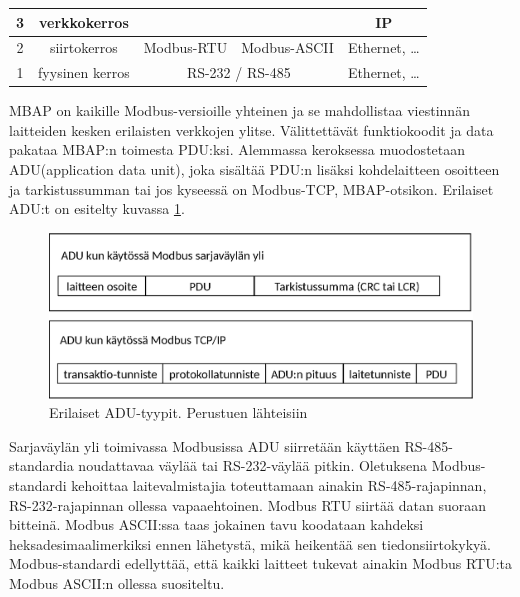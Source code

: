 \begin{table}
\begin{tabular}{|c|c|ccc}
        3                                         & verkkokerros                     &                                                         & \multicolumn{1}{c|}{}                                     & \multicolumn{1}{c|}{IP}                                                  \\ \hline
        2                                         & siirtokerros                     & \multicolumn{1}{c|}{\cellcolor{blue}Modbus-RTU}         & \multicolumn{1}{c|}{\cellcolor{blue}Modbus-ASCII}         & \multicolumn{1}{c|}{Ethernet, \dots}                                     \\ \hline
        1                                         & fyysinen kerros                  & \multicolumn{2}{c|}{RS-232 / RS-485}                                                                                & \multicolumn{1}{c|}{Ethernet, \dots}                                     \\ \hline
      \end{tabular}
      \label{rakenne}
    \end{table}

    \gls{MBAP} on kaikille Modbus-versioille yhteinen ja se mahdollistaa viestinnän laitteiden kesken erilaisten verkkojen ylitse. Välittettävät funktiokoodit ja data pakataa \gls{MBAP}:n toimesta PDU:ksi. Alemmassa keroksessa muodostetaan \gls{ADU}(application data unit), joka sisältää PDU:n lisäksi kohdelaitteen osoitteen ja tarkistussumman tai jos kyseessä on Modbus-TCP, \gls{MBAP}-otsikon. Erilaiset ADU:t on esitelty kuvassa \ref{fig:adu}.
    \begin{figure}[h]
      \centering
      \includegraphics[width=1\textwidth]{figures/adu}
      \caption[ADU-tyypit]{Erilaiset ADU-tyypit.  Perustuen lähteisiin \parencite{modbusTCPIPSpec, modbusSerialSpec}}
      \label{fig:adu}
    \end{figure}

    Sarjaväylän yli toimivassa Modbusissa ADU siirretään käyttäen RS-485-standardia noudattavaa väylää tai RS-232-väylää pitkin. Oletuksena Modbus-standardi kehoittaa laitevalmistajia toteuttamaan ainakin RS-485-rajapinnan, RS-232-rajapinnan ollessa vapaaehtoinen. Modbus \gls{RTU} siirtää datan suoraan bitteinä. Modbus \gls{ASCII}:ssa taas jokainen tavu koodataan kahdeksi heksadesimaalimerkiksi ennen lähetystä, mikä heikentää sen tiedonsiirtokykyä. Modbus-standardi edellyttää, että kaikki laitteet tukevat ainakin Modbus RTU:ta Modbus ASCII:n ollessa suositeltu.\parencite{modbusSerialSpec}

